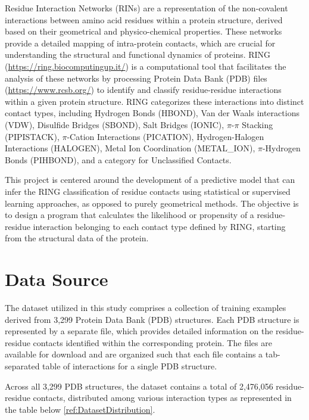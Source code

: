 \documentclass[10pt,twocolumn,letterpaper]{article}
\begin{document}
Residue Interaction Networks (RINs) are a representation of the non-covalent interactions between amino acid residues within a protein structure, derived based on their geometrical and physico-chemical properties. These networks provide a detailed mapping of intra-protein contacts, which are crucial for understanding the structural and functional dynamics of proteins. 
RING (\url{https://ring.biocomputingup.it/}) is a computational tool that facilitates the analysis of these networks by processing Protein Data Bank (PDB) files (\url{https://www.rcsb.org/}) to identify and classify residue-residue interactions within a given protein structure. 
RING categorizes these interactions into distinct contact types, including Hydrogen Bonds (HBOND), Van der Waals interactions (VDW), Disulfide Bridges (SBOND), Salt Bridges (IONIC), $\pi$-$\pi$ Stacking (PIPISTACK), $\pi$-Cation Interactions (PICATION), Hydrogen-Halogen Interactions (HALOGEN), Metal Ion Coordination (METAL\_ION), $\pi$-Hydrogen Bonds (PIHBOND), and a category for Unclassified Contacts.

This project is centered around the development of a predictive model that can infer the RING classification of residue contacts using statistical or supervised learning approaches, as opposed to purely geometrical methods. The objective is to design a program that calculates the likelihood or propensity of a residue-residue interaction belonging to each contact type defined by RING, starting from the structural data of the protein.


\section{Data Source}
\label{sec:datasource}

The dataset utilized in this study comprises a collection of training examples derived from 3,299 Protein Data Bank (PDB) structures. Each PDB structure is represented by a separate file, which provides detailed information on the residue-residue contacts identified within the corresponding protein. The files are available for download and are organized such that each file contains a tab-separated table of interactions for a single PDB structure. 

Across all 3,299 PDB structures, the dataset contains a total of 2,476,056 residue-residue contacts, distributed among various interaction types as represented in the table below \ref{ref:DatasetDistribution}.
\end{document}

